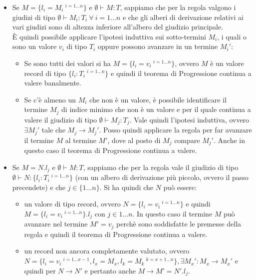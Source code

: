 \begin{itemize}
	\item {} Se $M = \{ l_i = M_i \:^{i = 1 \ldots n} \}$ e $\emptyset \vdash M : T$, sappiamo che per la regola  valgono i giudizi di tipo $\emptyset \vdash M_i : T_i \: \forall \: i = 1\ldots n$ e che gli alberi di derivazione relativi ai vari giudizi sono di altezza inferiore all'albero del giudizio principale.\\ \`E quindi possibile applicare l'ipotesi induttiva sui sotto-termini $M_i$, i quali o sono un valore $v_i$ di tipo $T_i$ oppure possono avanzare in un termine $M_i'$:
	\begin{itemize}
		\item Se sono tutti dei valori si ha $M = \{ l_i = v_i \:^{i = 1 \ldots n} \}$, ovvero $M$ \`e un valore record di tipo $\{ l_i : T_i \:^{i = 1 \ldots n} \}$ e quindi il teorema di Progressione continua a valere banalmente.
		\item Se c'\`e almeno un $M_i$ che non \`e un valore, \`e possibile identificare il termine $M_j$ di indice minimo che non \`e un valore e per il quale continua a valere il giudizio di tipo $\emptyset \vdash M_j : T_j$. Vale quindi l'ipotesi induttiva, ovvero $\exists M_j'$ tale che $M_j \to M_j'$. Posso quindi applicare la regola  per far avanzare il termine $M$ al termine $M'$, dove al posto di $M_j$ compare $M_j'$. Anche in questo caso il teorema di Progressione continua a valere.
	\end{itemize}
	\item {} Se $M = N.l_j$ e $\emptyset \vdash M : T$, sappiamo che per la regola  vale il giudizio di tipo $\emptyset \vdash N : \{ l_i : T_i \:^{i = 1 \ldots n}\}$ (con un albero di derivazione pi\`u piccolo, ovvero il passo precendete) e che $j \in \{1 \ldots n\}$.
	Si ha quindi che $N$ pu\`o essere:
	\begin{itemize}
		\item un valore di tipo record, ovvero $N = \{ l_i = v_i \:^{i = 1 \ldots n} \}$ e quindi $M = \{ l_i = v_i \:^{i = 1 \ldots n} \}.l_j$ con $j \in 1 \ldots n$. In questo caso il termine $M$ pu\`o avanzare nel termine $M' = v_j$ perch\`e sono soddisfatte le premesse della regola  e quindi il teorema di Progressione continua a valere.
		
		\item un record non ancora completamente valutato, ovvero $N = \{ l_i = v_i \:^{i = 1 \ldots x-1}, l_x = M_x, l_k = M_k \:^{k = x+1\ldots n}\}, \exists M_x': M_x \to M_x'$ e quindi per  $N \to N'$ e pertanto anche $M \to M' = N'.l_j$.
		

\end{itemize}
\end{itemize}
